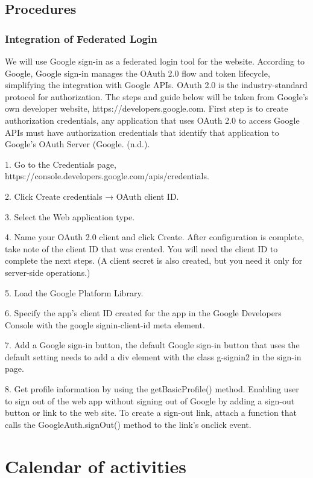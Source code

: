 \subsection{Procedures}

\subsubsection{Integration of Federated Login}

We will use Google sign-in as a federated login tool for the website. According to
Google, Google sign-in manages the OAuth 2.0 flow and token lifecycle, simplifying
the integration with Google APIs. OAuth 2.0 is the industry-standard protocol
for authorization. The steps and guide below will be taken from Google’s own
developer website, https://developers.google.com. First step is to create authorization
credentials, any application that uses OAuth 2.0 to access Google APIs
must have authorization credentials that identify that application to Google’s
OAuth Server (Google. (n.d.).

1. Go to the Credentials page, https://console.developers.google.com/apis/credentials.

2. Click Create credentials → OAuth client ID.

3. Select the Web application type.

4. Name your OAuth 2.0 client and click Create.
After configuration is complete, take note of the client ID that was
created. You will need the client ID to complete the next steps. (A client
secret is also created, but you need it only for server-side operations.)

5. Load the Google Platform Library.

6. Specify the app’s client ID created for the app in the Google Developers
Console with the google signin-client-id meta element.

7. Add a Google sign-in button, the default Google sign-in button that uses
the default setting needs to add a div element with the class g-signin2 in
the sign-in page.

8. Get profile information by using the getBasicProfile() method.
Enabling user to sign out of the web app without signing out of Google
by adding a sign-out button or link to the web site. To create a sign-out
link, attach a function that calls the GoogleAuth.signOut() method to the
link’s onclick event.

\section{Calendar of activities}

